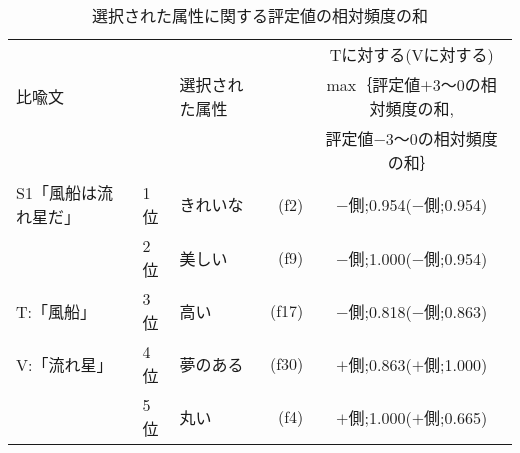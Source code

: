 \begin{table}[tb] 
\caption{選択された属性に関する評定値の相対頻度の和}
\label{tbl:hyo6}
\begin{center}
\begin{small}
\begin{tabular}{|l|llr|c|}
  \hline
      & &  &  & Tに対する(Vに対する)    \\
   比喩文 & &選択された属性 & & max｛評定値\(+3\)〜0の相対頻度の和, \\
           & &    & & \hspace{1cm}評定値\(-3\)〜0の相対頻度の和｝   \\
  \hline
 S1「風船は流れ星だ」 & 1位 & きれいな  & (f2) & $-$側;\hspace{0.1cm}0.954\hspace{0.3cm}($-$側;\hspace{0.1cm}0.954)    \\
           & 2位 & 美しい  & (f9) & $-$側;\hspace{0.1cm}1.000\hspace{0.3cm}($-$側;\hspace{0.1cm}0.954)     \\
    \hspace{0.8cm}T:\hspace{0.1cm}「風船」                & 3位 &
高い      & (f17) & $-$側;\hspace{0.1cm}0.818\hspace{0.3cm}($-$側;\hspace{0.1cm}0.863)    \\
    \hspace{0.8cm}V:\hspace{0.1cm}「流れ星」                & 4位 & 夢のある & 
 (f30) & $+$側;\hspace{0.1cm}0.863\hspace{0.3cm}($+$側;\hspace{0.1cm}1.000)   \\
                    & 5位 & 丸い  & (f4)  & $+$側;\hspace{0.1cm}1.000\hspace{0.3cm}($+$側;\hspace{0.1cm}0.665)   \\ \hline
\end{tabular}
\end{small}
\end{center}
\end{table}


